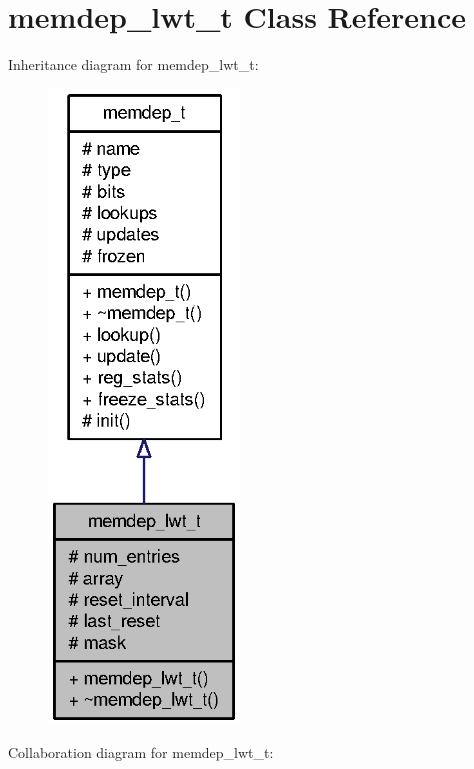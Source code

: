 \section{memdep\_\-lwt\_\-t Class Reference}
\label{classmemdep__lwt__t}
Inheritance diagram for memdep\_\-lwt\_\-t:\nopagebreak
\begin{figure}[H]
\begin{center}
\leavevmode
\includegraphics[width=144pt]{classmemdep__lwt__t__inherit__graph}
\end{center}
\end{figure}
Collaboration diagram for memdep\_\-lwt\_\-t:\nopagebreak
